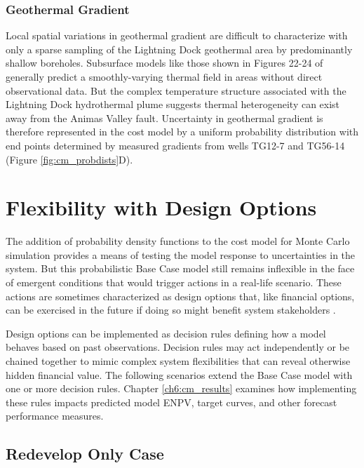\subsubsection{Geothermal Gradient}
\label{cm4:prob_grad}

Local spatial variations in geothermal gradient are difficult to characterize with only a sparse sampling of the Lightning Dock geothermal area by predominantly shallow boreholes. Subsurface models like those shown in Figures 22-24 of \citep{cunniff_final_2005} generally predict a smoothly-varying thermal field in areas without direct observational data. But the complex temperature structure associated with the Lightning Dock hydrothermal plume suggests thermal heterogeneity can exist away from the Animas Valley fault. Uncertainty in geothermal gradient is therefore represented in the cost model by a uniform probability distribution with end points determined by measured gradients from wells TG12-7 and TG56-14 (Figure \ref{fig:cm_probdists}D).

\section{Flexibility with Design Options}

The addition of probability density functions to the cost model for Monte Carlo simulation provides a means of testing the model response to uncertainties in the system. But this probabilistic Base Case model still remains inflexible in the face of emergent conditions that would trigger actions in a real-life scenario. These actions are sometimes characterized as design options that, like financial options, can be exercised in the future if doing so might benefit system stakeholders \citep[p.\ 270-272]{de_neufville_flexibility_2011}.

Design options can be implemented as decision rules defining how a model behaves based on past observations. Decision rules may act independently or be chained together to mimic complex system flexibilities that can reveal otherwise hidden financial value. The following scenarios extend the Base Case model with one or more decision rules. Chapter \ref{ch6:cm_results} examines how implementing these rules impacts predicted model ENPV, target curves, and other forecast performance measures.

\subsection{Redevelop Only Case}

